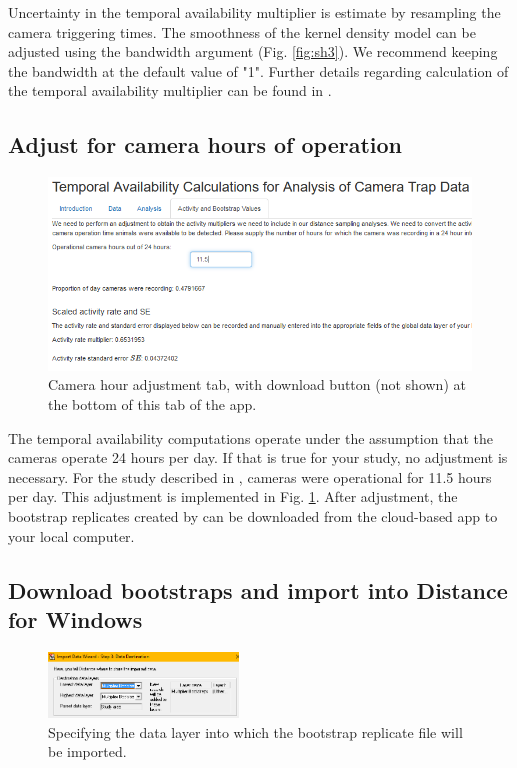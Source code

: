 \documentclass[a4paper, 10pt]{article}
\begin{document}
Uncertainty in the temporal availability multiplier is estimate by resampling the camera triggering times.  The smoothness of the kernel density model can be adjusted using the bandwidth argument (Fig. \ref{fig:sh3}).  We recommend keeping the bandwidth at the default value of "1".  Further details regarding calculation of the temporal availability multiplier can be found in \citet{activity_pkg}.


\subsection{Adjust for camera hours of operation}

\begin{figure}[H]
\includegraphics[width=\textwidth, frame]{images/shiny-tab4.png}
\caption{Camera hour adjustment tab, with download button (not shown) at the bottom of this tab of the app. \label{fig:sh4}}
\end{figure}

The temporal availability computations operate under the assumption that the cameras operate 24 hours per day.  If that is true for your study, no adjustment is necessary.  For the study described in \citet{howeetal}, cameras were operational for 11.5 hours per day.  This adjustment is implemented in Fig. \ref{fig:sh4}.  After adjustment, the bootstrap replicates created by \citet{activity_pkg} can be downloaded from the cloud-based app to your local computer.

\subsection{Download bootstraps and import into Distance for Windows}
\begin{figure}
\includegraphics[width=0.45\textwidth, frame]{images/import-layer.png}
\caption{Specifying the data layer into which the bootstrap replicate file will be imported. \label{fig:i-layer}}
\vspace{-25pt}
\end{figure}
\end{document}
